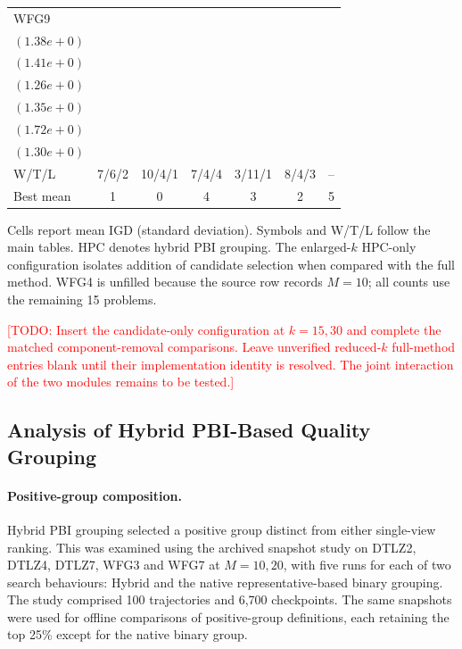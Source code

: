 \documentclass[final,5p,times,twocolumn]{elsarticle}
\newcommand{\TODO}[1]{\textcolor{red}{[TODO: #1]}}
\begin{document}
\begin{table}[t]
\begin{tabular}{lcccccc}
WFG9 & \shortstack{$2.6155e+1^{-}$\\$(1.38e+0)$} & \shortstack{$2.4590e+1^{-}$\\$(1.41e+0)$} & \shortstack{$2.5690e+1^{-}$\\$(1.26e+0)$} & \shortstack{$2.4763e+1^{-}$\\$(1.35e+0)$} & \shortstack{$2.4951e+1^{-}$\\$(1.72e+0)$} & \shortstack{$\mathbf{2.3053e+1}$\\$(1.30e+0)$} \\
\midrule
W/T/L & 7/6/2 & 10/4/1 & 7/4/4 & 3/11/1 & 8/4/3 & -- \\
Best mean & 1 & 0 & 4 & 3 & 2 & 5 \\
\bottomrule
\end{tabular}
\par\smallskip
\begin{minipage}{\linewidth}
\scriptsize Cells report mean IGD (standard deviation). Symbols and W/T/L follow the main tables. HPC denotes hybrid PBI grouping. The enlarged-$k$ HPC-only configuration isolates addition of candidate selection when compared with the full method. WFG4 is unfilled because the source row records $M=10$; all counts use the remaining 15 problems.
\end{minipage}
\end{table}

\TODO{Insert the candidate-only configuration at $k=15,30$ and complete
the matched component-removal comparisons. Leave unverified reduced-$k$
full-method entries blank until their implementation identity is resolved.
The joint interaction of the two modules remains to be tested.}

\subsection{Analysis of Hybrid PBI-Based Quality Grouping}
\label{sec:exp:hpc}

\paragraph{Positive-group composition.}
Hybrid PBI grouping selected a positive group distinct from either
single-view ranking. This was examined using the archived snapshot study
on DTLZ2, DTLZ4, DTLZ7, WFG3 and WFG7 at $M=10,20$, with five runs for
each of two search behaviours: Hybrid and the native representative-based
binary grouping. The study comprised 100 trajectories and 6,700
checkpoints. The same snapshots were used for offline comparisons of
positive-group definitions, each retaining the top 25\% except for the
native binary group.
\end{document}
